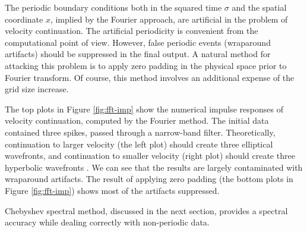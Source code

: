 \par
The periodic boundary conditions both in the squared time $\sigma$ and
the spatial coordinate $x$, implied by the Fourier approach, are
artificial in the problem of velocity continuation. The artificial
periodicity is convenient from the computational point of view.
However, false periodic events (wraparound artifacts) should be
suppressed in the final output. A natural method for attacking this
problem is to apply zero padding in the physical space prior to
Fourier transform. Of course, this method involves an additional
expense of the grid size increase.
\par
{}
\par
The top plots in Figure \ref{fig:fft-imp} show the numerical impulse
responses of velocity continuation, computed by the Fourier method.
The initial data contained three spikes, passed through a narrow-band
filter. Theoretically, continuation to larger velocity (the left plot)
should create three elliptical wavefronts, and continuation to smaller
velocity (right plot) should create three hyperbolic wavefronts
\cite[]{GEO50-01-01100126}. We can see that the results are largely
contaminated with wraparound artifacts. The result of applying zero
padding (the bottom plots in Figure \ref{fig:fft-imp}) shows most of
the artifacts suppressed.
\par
Chebyshev spectral method, discussed in the next section, provides a
spectral accuracy while dealing correctly with non-periodic data.
\par 
